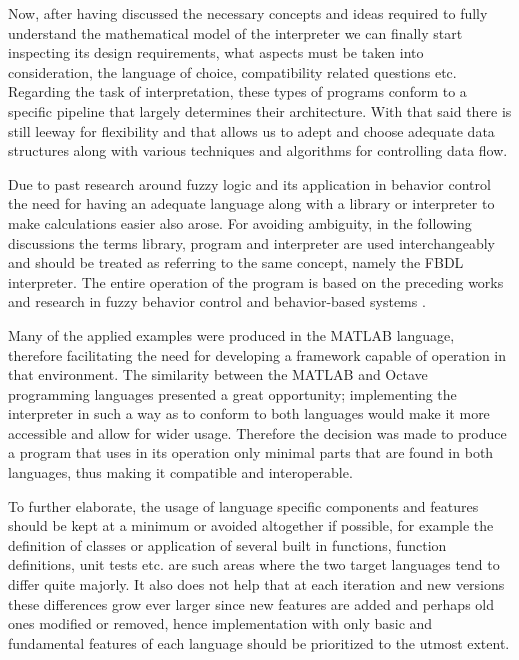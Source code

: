 Now, after having discussed the necessary concepts and ideas required to fully understand the mathematical model of the interpreter we can finally start inspecting its design requirements, what aspects must be taken into consideration, the language of choice, compatibility related questions etc. Regarding the task of interpretation, these types of programs conform to a specific pipeline that largely determines their architecture. With that said there is still leeway for flexibility and that allows us to adept and choose adequate data structures along with various techniques and algorithms for controlling data flow.

Due to past research around fuzzy logic and its application in behavior control the need for having an adequate language along with a library or interpreter to make calculations easier also arose. For avoiding ambiguity, in the following discussions the terms library, program and interpreter are used interchangeably and should be treated as referring to the same concept, namely the FBDL interpreter. The entire operation of the program is based on the preceding works and research in fuzzy behavior control and behavior-based systems \cite{pillerkovacs2019}.

Many of the applied examples were produced in the MATLAB language, therefore facilitating the need for  developing a framework capable of operation in that environment. The similarity between the MATLAB and Octave programming languages presented a great opportunity; implementing the interpreter in such a way as to conform to both languages would make it more accessible and allow for wider usage. Therefore the decision was made to produce a program that uses in its operation only minimal parts that are found in both languages, thus making it compatible and interoperable.

To further elaborate, the usage of language specific components and features should be kept at a minimum or avoided altogether if possible, for example the definition of classes or application of several built in functions, function definitions, unit tests etc. are such areas where the two target languages tend to differ quite majorly. It also does not help that at each iteration and new versions these differences grow ever larger since new features are added and perhaps old ones modified or removed, hence implementation with only basic and fundamental features of each language should be prioritized to the utmost extent.


